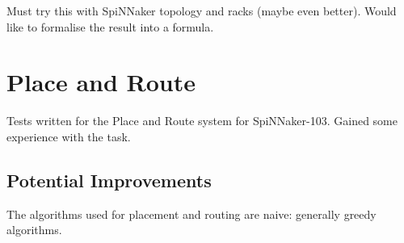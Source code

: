 			Must try this with SpiNNaker topology and racks (maybe even better). Would
			like to formalise the result into a formula.
	
	\section{Place and Route}
		
		Tests written for the Place and Route system for SpiNNaker-103. Gained some
		experience with the task. 
		
		\subsection{Potential Improvements}
			
			The algorithms used for placement and routing are naive: generally greedy
			algorithms.



